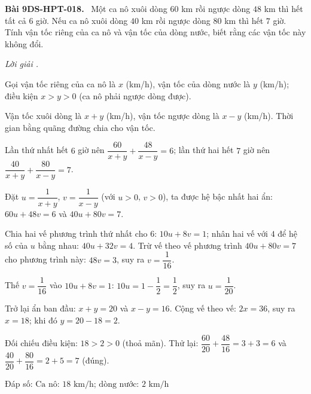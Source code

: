 \documentclass[12pt,a4paper]{article}
\newenvironment{problem}[1][]{\par\medskip\noindent\textbf{Bài #1.}\ }{\par}
\newenvironment{solution}[1][]{\par\noindent\textit{Lời giải #1.}\par}{\par}
\begin{document}
\begin{problem}[9DS-HPT-018]
Một ca nô xuôi dòng $60$ km rồi ngược dòng $48$ km thì hết tất cả $6$ giờ. Nếu ca nô xuôi dòng $40$ km rồi ngược dòng $80$ km thì hết $7$ giờ. Tính vận tốc riêng của ca nô và vận tốc của dòng nước, biết rằng các vận tốc này không đổi.

\begin{solution}
Gọi vận tốc riêng của ca nô là $x$ (km/h), vận tốc của dòng nước là $y$ (km/h); điều kiện $x > y > 0$ (ca nô phải ngược dòng được).

Vận tốc xuôi dòng là $x + y$ (km/h), vận tốc ngược dòng là $x - y$ (km/h). Thời gian bằng quãng đường chia cho vận tốc.

Lần thứ nhất hết $6$ giờ nên $\dfrac{60}{x + y} + \dfrac{48}{x - y} = 6$; lần thứ hai hết $7$ giờ nên $\dfrac{40}{x + y} + \dfrac{80}{x - y} = 7$.

Đặt $u = \dfrac{1}{x + y}$, $v = \dfrac{1}{x - y}$ (với $u > 0$, $v > 0$), ta được hệ bậc nhất hai ẩn: $60u + 48v = 6$ và $40u + 80v = 7$.

Chia hai vế phương trình thứ nhất cho $6$: $10u + 8v = 1$; nhân hai vế với $4$ để hệ số của $u$ bằng nhau: $40u + 32v = 4$. Trừ vế theo vế phương trình $40u + 80v = 7$ cho phương trình này: $48v = 3$, suy ra $v = \dfrac{1}{16}$.

Thế $v = \dfrac{1}{16}$ vào $10u + 8v = 1$: $10u = 1 - \dfrac{1}{2} = \dfrac{1}{2}$, suy ra $u = \dfrac{1}{20}$.

Trở lại ẩn ban đầu: $x + y = 20$ và $x - y = 16$. Cộng vế theo vế: $2x = 36$, suy ra $x = 18$; khi đó $y = 20 - 18 = 2$.

Đối chiếu điều kiện: $18 > 2 > 0$ (thoả mãn). Thử lại: $\dfrac{60}{20} + \dfrac{48}{16} = 3 + 3 = 6$ và $\dfrac{40}{20} + \dfrac{80}{16} = 2 + 5 = 7$ (đúng).

Đáp số: $\boxed{\text{Ca nô: } 18 \text{ km/h; dòng nước: } 2 \text{ km/h}}$
\end{solution}
\end{problem}
\end{document}
